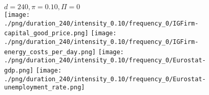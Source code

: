 \begin{figure}[ht!]
\centering\leavevmode
\begin{minipage}{13cm}
\centering\leavevmode
{$d=240, \pi=0.10, \Pi=0$}\\
\texttt{[image: ./png/duration\_240/intensity\_0.10/frequency\_0/IGFirm-capital\_good\_price.png]}
\texttt{[image: ./png/duration\_240/intensity\_0.10/frequency\_0/IGFirm-energy\_costs\_per\_day.png]}
\texttt{[image: ./png/duration\_240/intensity\_0.10/frequency\_0/Eurostat-gdp.png]}
\texttt{[image: ./png/duration\_240/intensity\_0.10/frequency\_0/Eurostat-unemployment\_rate.png]}
\end{minipage}
\end{figure}

